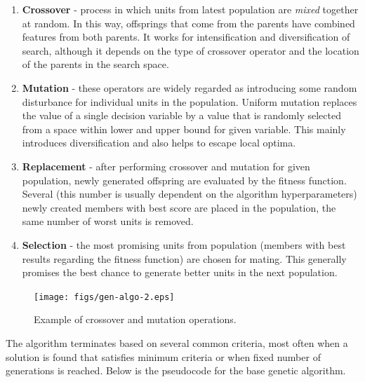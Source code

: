 \documentclass[12pt,a4paper,openany]{book}
\begin{document}

\begin{enumerate}
\item \textbf{Crossover} - process in which units from latest population are \textit{mixed} together at random. In this way, offsprings that come from the parents have combined features from both parents. It works for intensification and diversification of search, although it depends on the type of crossover operator and the location of the parents in the search space.
\item \textbf{Mutation} - these operators are widely regarded as introducing some random disturbance for individual units in the population. Uniform mutation replaces the value of a single decision variable by a value that is randomly selected from a space within lower and upper bound for given variable. This mainly introduces diversification and also helps to escape local optima.
\item \textbf{Replacement} - after performing crossover and mutation for given population, newly generated offspring are evaluated by the fitness function. Several (this number is usually dependent on the algorithm hyperparameters) newly created members with best score are placed in the population, the same number of worst units is removed.
\item \textbf{Selection} - the most promising units from population (members with best results regarding the fitness function) are chosen for mating. This generally promises the best chance to generate better units in the next population.
\end{enumerate}


 \begin{figure}[ht!]
     \centering
     \texttt{[image: figs/gen-algo-2.eps]}
     \caption{Example of crossover and mutation operations.}\label{Fig:PROGAN}
 \end{figure}
 
The algorithm terminates based on several common criteria, most often when a solution is found that satisfies minimum criteria or when fixed number of generations is reached. Below is the pseudocode for the base genetic algorithm. 
\end{document}
